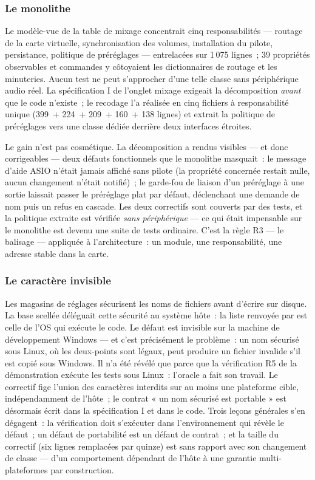 \subsubsection{Le monolithe}\label{sec:monolithe}

Le modèle-vue de la table de mixage concentrait cinq responsabilités —
routage de la carte virtuelle, synchronisation des volumes, installation du
pilote, persistance, politique de préréglages — entrelacées sur 1\,075
lignes~; 39 propriétés observables et commandes y côtoyaient les
dictionnaires de routage et les minuteries. Aucun test ne peut s’approcher
d’une telle classe sans périphérique audio réel. La spécification I de
l’onglet mixage exigeait la décomposition \emph{avant} que le code
n’existe~; le recodage l’a réalisée en cinq fichiers à responsabilité
unique (399~+ 224~+ 209~+ 160~+ 138 lignes) et extrait la politique de
préréglages vers une classe dédiée derrière deux interfaces étroites.

Le gain n’est pas cosmétique. La décomposition a rendus visibles — et
donc corrigeables — deux défauts fonctionnels que le monolithe masquait~:
le message d’aide ASIO n’était jamais affiché sans pilote (la propriété
concernée restait nulle, aucun changement n’était notifié)~; le garde-fou
de liaison d’un préréglage à une sortie laissait passer le préréglage plat
par défaut, déclenchant une demande de nom puis un refus en cascade. Les
deux correctifs sont couverts par des tests, et la politique extraite est
vérifiée \emph{sans périphérique} — ce qui était impensable sur le
monolithe est devenu une suite de tests ordinaire. C’est la règle R3 — le
balisage — appliquée à l’architecture~: un module, une responsabilité, une
adresse stable dans la carte.

\subsubsection{Le caractère invisible}\label{sec:caractere}

Les magasins de réglages sécurisent les noms de fichiers avant d’écrire sur
disque. La base scellée déléguait cette sécurité au système hôte~: la liste
renvoyée par  est celle de l’OS qui
exécute le code. Le défaut est invisible sur la machine de
développement Windows — et c’est précisément le problème~: un nom sécurisé
sous Linux, où les deux-points sont légaux, peut produire un fichier
invalide s’il est copié sous Windows. Il n’a été révélé que parce que la
vérification R5 de la démonstration exécute les tests sous Linux~:
l’oracle a fait son travail. Le correctif fige l’union des caractères
interdits sur au moins une plateforme cible, indépendamment de l’hôte~; le
contrat « un nom sécurisé est portable » est désormais écrit dans
la spécification I et dans le code. Trois leçons générales s’en
dégagent~: la vérification doit s’exécuter dans l’environnement qui révèle
le défaut~; un défaut de portabilité est un défaut de contrat~; et la
taille du correctif (six lignes remplacées par quinze) est sans rapport
avec son changement de classe — d’un comportement dépendant de l’hôte à
une garantie multi-plateformes par construction.


